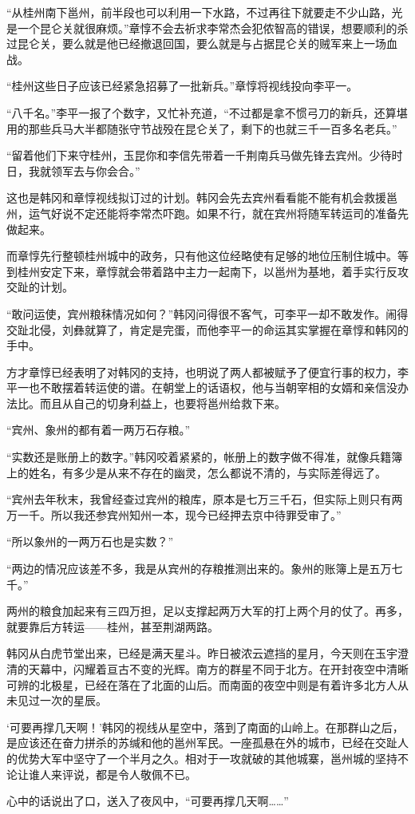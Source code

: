 “从桂州南下邕州，前半段也可以利用一下水路，不过再往下就要走不少山路，光是一个昆仑关就很麻烦。”章惇不会去祈求李常杰会犯侬智高的错误，想要顺利的杀过昆仑关，要么就是他已经撤退回国，要么就是与占据昆仑关的贼军来上一场血战。

“桂州这些日子应该已经紧急招募了一批新兵。”章惇将视线投向李平一。

“八千名。”李平一报了个数字，又忙补充道，“不过都是拿不惯弓刀的新兵，还算堪用的那些兵马大半都随张守节战殁在昆仑关了，剩下的也就三千一百多名老兵。”

“留着他们下来守桂州，玉昆你和李信先带着一千荆南兵马做先锋去宾州。少待时日，我就领军去与你会合。”

这也是韩冈和章惇视线拟订过的计划。韩冈会先去宾州看看能不能有机会救援邕州，运气好说不定还能将李常杰吓跑。如果不行，就在宾州将随军转运司的准备先做起来。

而章惇先行整顿桂州城中的政务，只有他这位经略使有足够的地位压制住城中。等到桂州安定下来，章惇就会带着路中主力一起南下，以邕州为基地，着手实行反攻交趾的计划。

“敢问运使，宾州粮秣情况如何？”韩冈问得很不客气，可李平一却不敢发作。闹得交趾北侵，刘彝就算了，肯定是完蛋，而他李平一的命运其实掌握在章惇和韩冈的手中。

方才章惇已经表明了对韩冈的支持，也明说了两人都被赋予了便宜行事的权力，李平一也不敢摆着转运使的谱。在朝堂上的话语权，他与当朝宰相的女婿和亲信没办法比。而且从自己的切身利益上，也要将邕州给救下来。

“宾州、象州的都有着一两万石存粮。”

“实数还是账册上的数字。”韩冈咬着紧紧的，帐册上的数字做不得准，就像兵籍簿上的姓名，有多少是从来不存在的幽灵，怎么都说不清的，与实际差得远了。

“宾州去年秋末，我曾经查过宾州的粮库，原本是七万三千石，但实际上则只有两万一千。所以我还参宾州知州一本，现今已经押去京中待罪受审了。”

“所以象州的一两万石也是实数？”

“两边的情况应该差不多，我是从宾州的存粮推测出来的。象州的账簿上是五万七千。”

两州的粮食加起来有三四万担，足以支撑起两万大军的打上两个月的仗了。再多，就要靠后方转运——桂州，甚至荆湖两路。

韩冈从白虎节堂出来，已经是满天星斗。昨日被浓云遮挡的星月，今天则在玉宇澄清的天幕中，闪耀着亘古不变的光辉。南方的群星不同于北方。在开封夜空中清晰可辨的北极星，已经在落在了北面的山后。而南面的夜空中则是有着许多北方人从未见过一次的星辰。

‘可要再撑几天啊！’韩冈的视线从星空中，落到了南面的山岭上。在那群山之后，是应该还在奋力拼杀的苏缄和他的邕州军民。一座孤悬在外的城市，已经在交趾人的优势大军中坚守了一个半月之久。相对于一攻就破的其他城寨，邕州城的坚持不论让谁人来评说，都是令人敬佩不已。

心中的话说出了口，送入了夜风中，“可要再撑几天啊……”

